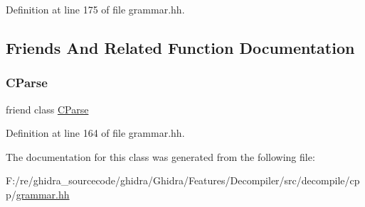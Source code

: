 Definition at line 175 of file grammar.\+hh.



\subsection{Friends And Related Function Documentation}
\mbox{\label{class_type_declarator_a64fbc03374b5d67634430ade1bcbbadd}} 
\subsubsection{\texorpdfstring{CParse}{CParse}}
{\footnotesize\ttfamily friend class \mbox{\hyperlink{class_c_parse}{C\+Parse}}\hspace{0.3cm}{\ttfamily [friend]}}



Definition at line 164 of file grammar.\+hh.



The documentation for this class was generated from the following file\+:\begin{DoxyCompactItemize}
\item 
F\+:/re/ghidra\+\_\+sourcecode/ghidra/\+Ghidra/\+Features/\+Decompiler/src/decompile/cpp/\mbox{\hyperlink{grammar_8hh}{grammar.\+hh}}\end{DoxyCompactItemize}
